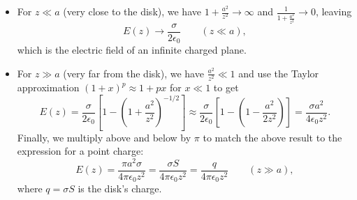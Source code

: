 \documentclass[11pt, a4paper]{article}
\newcommand{\ee}{\epsilon_{0}}  %
\begin{document}
\begin{itemize}
	\item For $ z \ll a $ (very close to the disk), we have $ 1 + \frac{a^{2}}{z^{2}} \to \infty $ and $ \frac{1}{1 + \frac{a^{2}}{z^{2}}} \to 0$, leaving \vspace{-2mm}
	\begin{equation*}
		E(z) \to \frac{\sigma}{2\ee} \qquad (z \ll a),
	\end{equation*}
	which is the electric field of an infinite charged plane.
	
	\item For $ z \gg a $ (very far from the disk), we have $ \frac{a^{2}}{z^{2}} \ll 1 $ and use the Taylor approximation $ (1 + x)^{p} \approx 1 + px $ for $ x \ll 1 $ to get
	\begin{equation*}
		E(z) = \frac{\sigma}{2\ee} \left[1 -  \left (1 + \frac{a^{2}}{z^{2}}\right )^{-1/2}\right] \approx \frac{\sigma}{2\ee}\left[ 1 - \left(1 - \frac{a^{2}}{2z^{2}}\right) \right] = \frac{\sigma a^{2}}{4\ee z^{2}}.
	\end{equation*}
	Finally, we multiply above and below by $ \pi $ to match the above result to the expression for a point charge:
	\begin{equation*}
		E(z) = \frac{\pi a^{2} \sigma}{4\pi \ee z^{2}} = \frac{\sigma S}{4\pi \ee z^{2}} = \frac{q}{4\pi \ee z^{2}}  \qquad (z \gg a),
	\end{equation*}
	where $ q = \sigma S $ is the disk's charge. 

\end{itemize}
\end{document}
